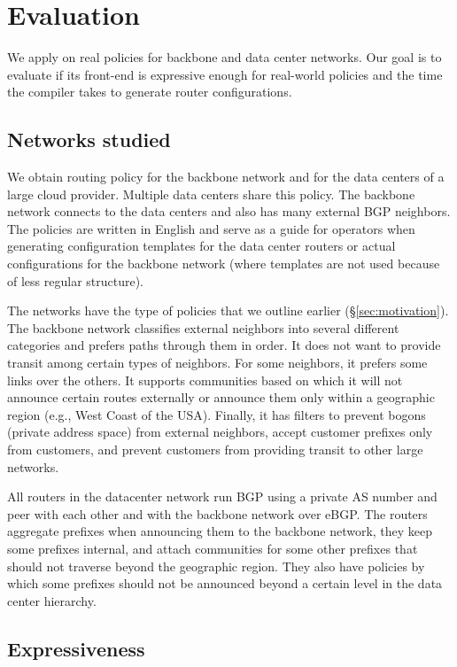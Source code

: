 \section{Evaluation}

We apply \sysname on real policies for backbone and data center networks. Our goal is to evaluate if its front-end is expressive enough for real-world policies and the time the compiler takes to generate router configurations. 

\subsection{Networks studied}

We obtain routing policy for the backbone network and for the data centers of a large cloud provider. Multiple data centers share this policy. The backbone network connects to the data centers and also has many external BGP neighbors. The policies are written in English and serve as a guide for operators when generating configuration templates for the data center routers or actual configurations for the backbone network (where templates are not used because of less regular structure).

The networks have the type of policies that we outline earlier (\S\ref{sec:motivation}). The backbone network classifies external neighbors into several different categories and prefers paths through them in order. It does not want to provide transit among certain types of neighbors. For some neighbors, it prefers some links over the others. It supports communities based on which it will not announce certain routes externally or announce them only within a geographic region (e.g., West Coast of the USA). Finally, it has filters to prevent bogons (private address space) from external neighbors, accept customer prefixes only from customers, and prevent customers from providing transit to other large networks.

All routers in the datacenter network run BGP using a private AS number and peer with each other and with the backbone network over eBGP. The routers aggregate prefixes when announcing them to the backbone network, they keep some prefixes internal, and attach communities for some other prefixes that should not traverse beyond the geographic region. They also have policies by which some prefixes should not be announced beyond a certain level in the data center hierarchy.

\subsection{Expressiveness}

